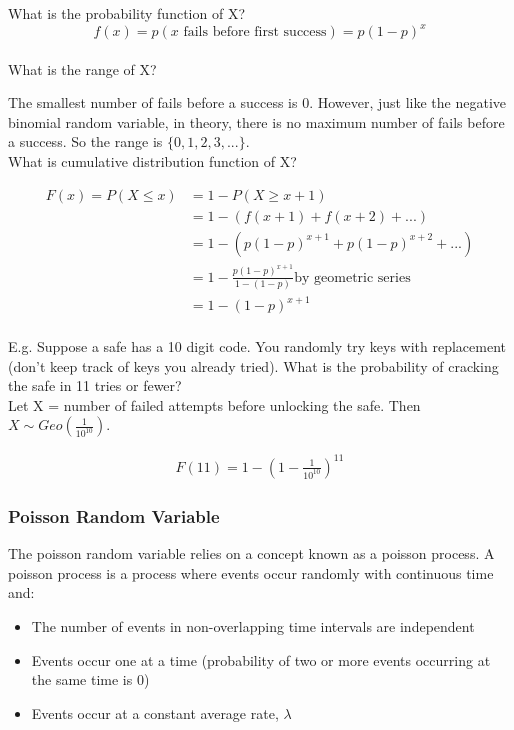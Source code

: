 \documentclass[12pt, letterpaper]{article}
\begin{document}
What is the probability function of X?
\begin{equation}
f\left(x\right) = p\left(\text{$x$ fails before first success}\right) = p(1 - p)^x
\end{equation}\\

What is the range of X?

The smallest number of fails before a success is 0. However, just like the negative binomial random variable, in theory, there is no maximum number of fails before a success. So the range is \(\{0, 1, 2, 3, ...\}\).\\

What is cumulative distribution function of X?

\begin{align*}
F\left(x\right) = P\left(X \leq x\right)
&= 1 - P\left(X \geq x + 1\right)\\
&= 1 - (f\left(x + 1\right) + f\left(x + 2\right) + ...)\\
&= 1 - (p(1 - p)^{x + 1} + p(1 - p)^{x + 2} + ...)\\
&= 1 - \frac{p(1 - p)^{x + 1}}{1 - (1 - p)} \text{by geometric series}\\
&= 1 - (1 - p)^{x + 1}
\end{align*}\\

E.g. Suppose a safe has a 10 digit code. You randomly try keys with replacement (don't keep track of keys you already tried). What is the probability of cracking the safe in 11 tries or fewer?\\

Let X = number of failed attempts before unlocking the safe. Then \(X \sim Geo(\frac{1}{10^{10}})\).

\begin{align*}
F\left(11\right) = 1 - (1 - \frac{1}{10^{10}})^{11}
\end{align*}

\subsubsection{Poisson Random Variable}
The poisson random variable relies on a concept known as a poisson process. A poisson process is a process where events occur randomly with continuous time and:
\begin{itemize}
\item The number of events in non-overlapping time intervals are independent
\item Events occur one at a time (probability of two or more events occurring at the same time is 0) 
\item Events occur at a constant average rate, \(\lambda\)
\end{itemize} 
\end{document}
